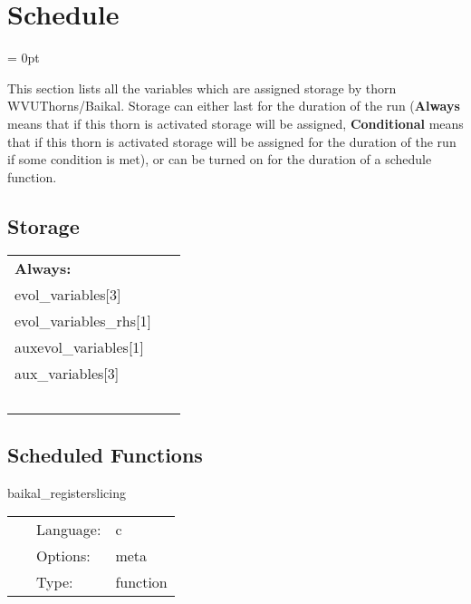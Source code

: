 
\section{Schedule} 


\parskip = 0pt


\noindent This section lists all the variables which are assigned storage by thorn WVUThorns/Baikal.  Storage can either last for the duration of the run ({\bf Always} means that if this thorn is activated storage will be assigned, {\bf Conditional} means that if this thorn is activated storage will be assigned for the duration of the run if some condition is met), or can be turned on for the duration of a schedule function.


\subsection*{Storage}

\hspace{5mm}

 \begin{tabular*}{160mm}{ll} 

{\bf Always:}&  ~ \\ 
 evol\_variables[3] & ~\\ 
 evol\_variables\_rhs[1] & ~\\ 
 auxevol\_variables[1] & ~\\ 
 aux\_variables[3] & ~\\ 
~ & ~\\ 
\end{tabular*} 


\subsection*{Scheduled Functions}
\vspace{5mm}


\hspace{5mm} baikal\_registerslicing 

\hspace{5mm}{\it register 3+1 slicing condition } 


\hspace{5mm}

 \begin{tabular*}{160mm}{cll} 
~ & Language:  & c \\ 
~ & Options:  & meta \\ 
~ & Type:  & function \\ 
\end{tabular*} 


